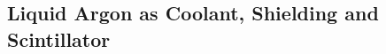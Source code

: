 \documentclass[encoding=utf8,british]{tumphthesis}
\begin{document}

\subsection{Liquid Argon as Coolant, Shielding and Scintillator} 
\label{sec:LArcoolant}
\end{document}
